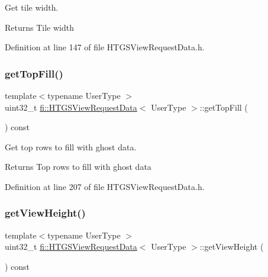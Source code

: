 Get tile width. 

\begin{DoxyReturn}{Returns}
Tile width 
\end{DoxyReturn}


Definition at line 147 of file H\+T\+G\+S\+View\+Request\+Data.\+h.

\mbox{\label{classfi_1_1HTGSViewRequestData_a7e332cee8cff6b280063ef21f47a3ee5}} 
\subsubsection{\texorpdfstring{get\+Top\+Fill()}{getTopFill()}}
{\footnotesize\ttfamily template$<$typename User\+Type $>$ \\
uint32\+\_\+t \hyperlink{classfi_1_1HTGSViewRequestData}{fi\+::\+H\+T\+G\+S\+View\+Request\+Data}$<$ User\+Type $>$\+::get\+Top\+Fill (\begin{DoxyParamCaption}{ }\end{DoxyParamCaption}) const\hspace{0.3cm}{\ttfamily [inline]}}



Get top rows to fill with ghost data. 

\begin{DoxyReturn}{Returns}
Top rows to fill with ghost data 
\end{DoxyReturn}


Definition at line 207 of file H\+T\+G\+S\+View\+Request\+Data.\+h.

\mbox{\label{classfi_1_1HTGSViewRequestData_ac62cf82ff21f65ecf2ba90dee912fc9f}} 
\subsubsection{\texorpdfstring{get\+View\+Height()}{getViewHeight()}}
{\footnotesize\ttfamily template$<$typename User\+Type $>$ \\
uint32\+\_\+t \hyperlink{classfi_1_1HTGSViewRequestData}{fi\+::\+H\+T\+G\+S\+View\+Request\+Data}$<$ User\+Type $>$\+::get\+View\+Height (\begin{DoxyParamCaption}{ }\end{DoxyParamCaption}) const\hspace{0.3cm}{\ttfamily [inline]}}



